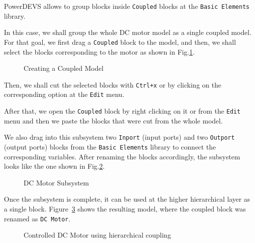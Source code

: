 PowerDEVS allows to group blocks inside \verb"Coupled" blocks at the \verb"Basic Elements" library.

In this case, we shall group the whole DC motor model as a single coupled model. For that goal, we first drag a \verb"Coupled" block to the model, and then, we shall select the blocks corresponding to the motor as shown in Fig.\ref{fig:select_model}.

\begin{figure}[h]
 \caption{Creating a Coupled Model}
 \label{fig:select_model}
\end{figure}
 
Then, we shall cut the selected blocks with \verb"Ctrl+x" or by clicking on the corresponding option at the \verb"Edit" menu.

After that, we open the \verb"Coupled" block by right clicking on it or from the \verb"Edit" menu and then we paste the blocks that were cut from the whole model.

We also drag into this subsystem two \verb"Inport" (input ports) and two \verb"Outport" (output ports) blocks from the \verb"Basic Elements" library to connect the corresponding variables. After renaming the blocks accordingly, the subsystem looks like the one shown in Fig.\ref{fig:motor_subsys}.

\begin{figure}[h]
 \caption{DC Motor Subsystem}
 \label{fig:motor_subsys}
\end{figure}

Once the subsystem is complete, it can be used at the higher hierarchical layer as a single block. Figure~\ref{fig:db_pi_motor_coup} shows the resulting model, where the coupled block was renamed as \verb"DC Motor".

\begin{figure}[h]
 \caption{Controlled DC Motor using hierarchical coupling}
 \label{fig:db_pi_motor_coup}
\end{figure}

